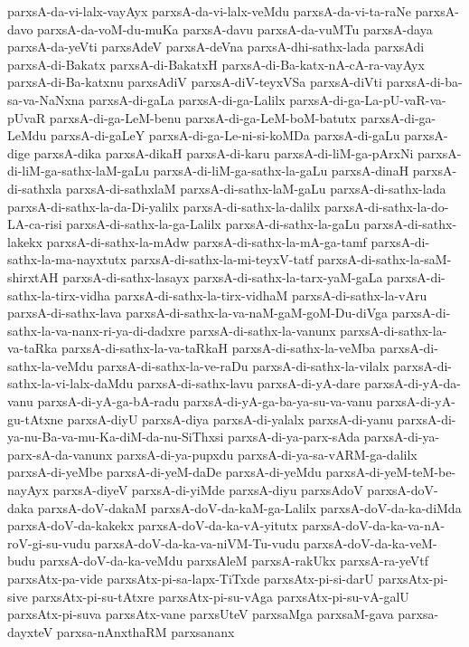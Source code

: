 {parxsA-da-vi-lalx-vayAyx
parxsA-da-vi-lalx-veMdu
parxsA-da-vi-ta-raNe
parxsA-davo
parxsA-da-voM-du-muKa
parxsA-davu
parxsA-da-vuMTu
parxsA-daya
parxsA-da-yeVti
parxsAdeV
parxsA-deVna
parxsA-dhi-sathx-lada
parxsAdi
parxsA-di-Bakatx
parxsA-di-BakatxH
parxsA-di-Ba-katx-nA-cA-ra-vayAyx
parxsA-di-Ba-katxnu
parxsAdiV
parxsA-diV-teyxVSa
parxsA-diVti
parxsA-di-ba-sa-va-NaNxna
parxsA-di-gaLa
parxsA-di-ga-Lalilx
parxsA-di-ga-La-pU-vaR-va-pUvaR
parxsA-di-ga-LeM-benu
parxsA-di-ga-LeM-boM-batutx
parxsA-di-ga-LeMdu
parxsA-di-gaLeY
parxsA-di-ga-Le-ni-si-koMDa
parxsA-di-gaLu
parxsA-dige
parxsA-dika
parxsA-dikaH
parxsA-di-karu
parxsA-di-liM-ga-pArxNi
parxsA-di-liM-ga-sathx-laM-gaLu
parxsA-di-liM-ga-sathx-la-gaLu
parxsA-dinaH
parxsA-di-sathxla
parxsA-di-sathxlaM
parxsA-di-sathx-laM-gaLu
parxsA-di-sathx-lada
parxsA-di-sathx-la-da-Di-yalilx
parxsA-di-sathx-la-dalilx
parxsA-di-sathx-la-do-LA-ca-risi
parxsA-di-sathx-la-ga-Lalilx
parxsA-di-sathx-la-gaLu
parxsA-di-sathx-lakekx
parxsA-di-sathx-la-mAdw
parxsA-di-sathx-la-mA-ga-tamf
parxsA-di-sathx-la-ma-nayxtutx
parxsA-di-sathx-la-mi-teyxV-tatf
parxsA-di-sathx-la-saM-shirxtAH
parxsA-di-sathx-lasayx
parxsA-di-sathx-la-tarx-yaM-gaLa
parxsA-di-sathx-la-tirx-vidha
parxsA-di-sathx-la-tirx-vidhaM
parxsA-di-sathx-la-vAru
parxsA-di-sathx-lava
parxsA-di-sathx-la-va-naM-gaM-goM-Du-diVga
parxsA-di-sathx-la-va-nanx-ri-ya-di-dadxre
parxsA-di-sathx-la-vanunx
parxsA-di-sathx-la-va-taRka
parxsA-di-sathx-la-va-taRkaH
parxsA-di-sathx-la-veMba
parxsA-di-sathx-la-veMdu
parxsA-di-sathx-la-ve-raDu
parxsA-di-sathx-la-vilalx
parxsA-di-sathx-la-vi-lalx-daMdu
parxsA-di-sathx-lavu
parxsA-di-yA-dare
parxsA-di-yA-da-vanu
parxsA-di-yA-ga-bA-radu
parxsA-di-yA-ga-ba-ya-su-va-vanu
parxsA-di-yA-gu-tAtxne
parxsA-diyU
parxsA-diya
parxsA-di-yalalx
parxsA-di-yanu
parxsA-di-ya-nu-Ba-va-mu-Ka-diM-da-nu-SiThxsi
parxsA-di-ya-parx-sAda
parxsA-di-ya-parx-sA-da-vanunx
parxsA-di-ya-pupxdu
parxsA-di-ya-sa-vARM-ga-dalilx
parxsA-di-yeMbe
parxsA-di-yeM-daDe
parxsA-di-yeMdu
parxsA-di-yeM-teM-be-nayAyx
parxsA-diyeV
parxsA-di-yiMde
parxsA-diyu
parxsAdoV
parxsA-doV-daka
parxsA-doV-dakaM
parxsA-doV-da-kaM-ga-Lalilx
parxsA-doV-da-ka-diMda
parxsA-doV-da-kakekx
parxsA-doV-da-ka-vA-yitutx
parxsA-doV-da-ka-va-nA-roV-gi-su-vudu
parxsA-doV-da-ka-va-niVM-Tu-vudu
parxsA-doV-da-ka-veM-budu
parxsA-doV-da-ka-veMdu
parxsAleM
parxsA-rakUkx
parxsA-ra-yeVtf
parxsAtx-pa-vide
parxsAtx-pi-sa-lapx-TiTxde
parxsAtx-pi-si-darU
parxsAtx-pi-sive
parxsAtx-pi-su-tAtxre
parxsAtx-pi-su-vAga
parxsAtx-pi-su-vA-galU
parxsAtx-pi-suva
parxsAtx-vane
parxsUteV
parxsaMga
parxsaM-gava
parxsa-dayxteV
parxsa-nAnxthaRM
parxsananx
}
